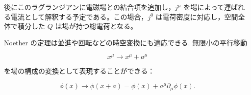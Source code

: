 \documentclass[a4paper,12pt]{article}
\begin{document}
\bigskip

後にこのラグランジアンに電磁場との結合項を追加し，$j^\mu$ を場によって運ばれる電流として解釈する予定である。この場合，$j^0$ は電荷密度に対応し，空間全体で積分した $Q$ は場が持つ総電荷となる。\par
Noether の定理は並進や回転などの時空変換にも適応できる. 無限小の平行移動

\begin{equation*}
    x^\mu \to x^\mu + a^\mu
\end{equation*}

を場の構成の変換として表現することができる：

\begin{equation*}
    \phi(x) \to \phi(x+a) = \phi(x) + a^\mu \partial_\mu \phi(x).
\end{equation*}
\end{document}
